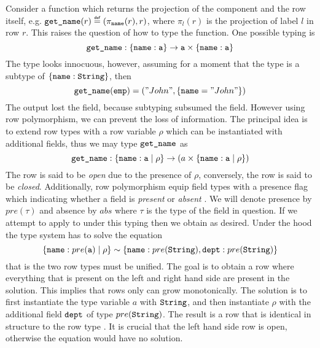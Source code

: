 Consider a function which returns the projection of the  component and the row itself, e.g. $\code{get\_name}(r) \defas (\pi_{\code{name}}(r), r)$, where $\pi_l(r)$ is the projection of label $l$ in row $r$. This raises the question of how to type the function. One possible typing is 
\[ \texttt{get\_name} : \left\{ \texttt{name}:\texttt{a} \right\} \to \texttt{a} \times \left\{ \texttt{name}:\texttt{a} \right\} \]
The type looks innocuous, however, assuming for a moment that the type  is a subtype of $\left\{ \texttt{name}:\texttt{String} \right\}$, then 
\[
  \texttt{get\_name}(\texttt{emp}) = ("John", \left\{ \texttt{name}="John" \right\})
\]
The output lost the  field, because subtyping subsumed the field. However using row polymorphism, we can prevent the loss of information.
The principal idea is to extend row types with a row variable $\rho$ which can be instantiated with additional fields, thus we may type $\texttt{get\_name}$ as
\[ \texttt{get\_name} : \left\{ \texttt{name}:\texttt{a} \; | \; \rho \right\} \to (a \times \left\{ \texttt{name}:\texttt{a} \; | \; \rho \right\}) \]
The row  is said to be \emph{open} due to the presence of $\rho$, conversely, the row  is said to be \emph{closed}. Additionally, row polymorphism equip field types with a presence flag which indicating whether a field is \emph{present} or \emph{absent} \cite{Remy1993}. We will denote presence by $pre(\tau)$ and absence by $abs$ where $\tau$ is the type of the field in question. If we attempt to apply  to  under this typing then we obtain  as desired. Under the hood the type system has to solve the equation 
\[ 
\left\{ \texttt{name}:pre(\texttt{a}) \; | \; \rho \right\} \sim \left\{ \texttt{name}:pre(\texttt{String}),\texttt{dept}:pre(\texttt{String}) \right\}
\]
that is the two row types must be unified. The goal is to obtain a row where everything that is present on the left and right hand side are present in the solution. %
This implies that rows only can grow monotonically.
The solution is to first instantiate the type variable $a$ with $\texttt{String}$, and then instantiate $\rho$ with the additional field $\texttt{dept}$ of type $pre(\texttt{String})$. The result is a row that is identical in structure to the row type . It is crucial that the left hand side row is open, otherwise the equation would have no solution.


